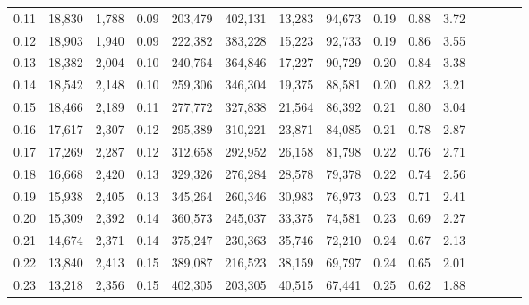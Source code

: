 \begin{tabular}{rrrcrrrrrrrrrrr}
0.11 &  18,830 &  1,788 &                                       0.09 &  203,479 &  402,131 &   13,283 &   94,673 &  0.19 &  0.88 &                         3.72 \\
0.12 &  18,903 &  1,940 &                                       0.09 &  222,382 &  383,228 &   15,223 &   92,733 &  0.19 &  0.86 &                         3.55 \\
0.13 &  18,382 &  2,004 &                                       0.10 &  240,764 &  364,846 &   17,227 &   90,729 &  0.20 &  0.84 &                         3.38 \\
0.14 &  18,542 &  2,148 &                                       0.10 &  259,306 &  346,304 &   19,375 &   88,581 &  0.20 &  0.82 &                         3.21 \\
0.15 &  18,466 &  2,189 &                                       0.11 &  277,772 &  327,838 &   21,564 &   86,392 &  0.21 &  0.80 &                         3.04 \\
0.16 &  17,617 &  2,307 &                                       0.12 &  295,389 &  310,221 &   23,871 &   84,085 &  0.21 &  0.78 &                         2.87 \\
0.17 &  17,269 &  2,287 &                                       0.12 &  312,658 &  292,952 &   26,158 &   81,798 &  0.22 &  0.76 &                         2.71 \\
0.18 &  16,668 &  2,420 &                                       0.13 &  329,326 &  276,284 &   28,578 &   79,378 &  0.22 &  0.74 &                         2.56 \\
0.19 &  15,938 &  2,405 &                                       0.13 &  345,264 &  260,346 &   30,983 &   76,973 &  0.23 &  0.71 &                         2.41 \\
0.20 &  15,309 &  2,392 &                                       0.14 &  360,573 &  245,037 &   33,375 &   74,581 &  0.23 &  0.69 &                         2.27 \\
0.21 &  14,674 &  2,371 &                                       0.14 &  375,247 &  230,363 &   35,746 &   72,210 &  0.24 &  0.67 &                         2.13 \\
0.22 &  13,840 &  2,413 &                                       0.15 &  389,087 &  216,523 &   38,159 &   69,797 &  0.24 &  0.65 &                         2.01 \\
0.23 &  13,218 &  2,356 &                                       0.15 &  402,305 &  203,305 &   40,515 &   67,441 &  0.25 &  0.62 &                         1.88 \\

\end{tabular}
